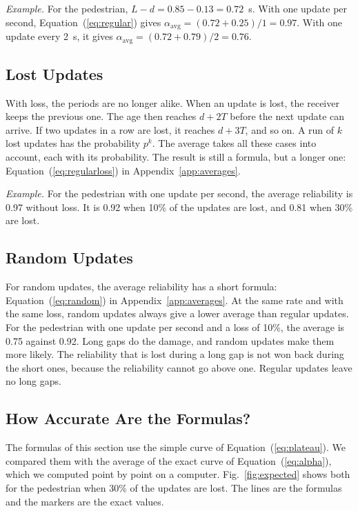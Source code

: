\documentclass[conference]{IEEEtran}
\newcommand{\aav}{\alpha_{\mathrm{avg}}}     %
\newcommand{\Eq}[1]{Equation~(\ref{#1})}     %
\begin{document}
\emph{Example.} For the pedestrian, $L-d=0.85-0.13=0.72$~s. With one update
per second, \Eq{eq:regular} gives $\aav=(0.72+0.25)/1=0.97$. With one update
every 2~s, it gives $\aav=(0.72+0.79)/2=0.76$.

\subsection{Lost Updates}

With loss, the periods are no longer alike. When an update is lost, the
receiver keeps the previous one. The age then reaches $d+2T$ before the next
update can arrive. If two updates in a row are lost, it reaches $d+3T$, and so
on. A run of $k$ lost updates has the probability $p^k$. The average takes all
these cases into account, each with its probability. The result is still a
formula, but a longer one: \Eq{eq:regularloss} in
Appendix~\ref{app:averages}.

\emph{Example.} For the pedestrian with one update per second, the average
reliability is 0.97 without loss. It is 0.92 when 10\% of the updates are
lost, and 0.81 when 30\% are lost.

\subsection{Random Updates}

For random updates, the average reliability has a short formula:
\Eq{eq:random} in Appendix~\ref{app:averages}. At the same rate and with the same loss, random updates always give a lower
average than regular updates. For the pedestrian with one update per second
and a loss of 10\%, the average is 0.75 against 0.92. Long gaps do the
damage, and random updates make them more likely. The reliability that is lost
during a long gap is not won back during the short ones, because the
reliability cannot go above one. Regular updates leave no long gaps.

\subsection{How Accurate Are the Formulas?}

The formulas of this section use the simple curve of \Eq{eq:plateau}. We
compared them with the average of the exact curve of \Eq{eq:alpha}, which we
computed point by point on a computer. Fig.~\ref{fig:expected} shows both for
the pedestrian when 30\% of the updates are lost. The lines are the formulas
and the markers are the exact values.
\end{document}
